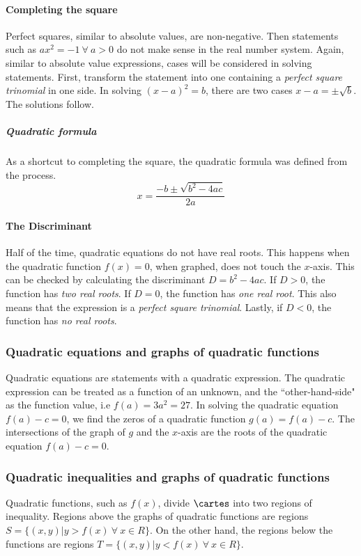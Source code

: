 \paragraph{Completing the square}
Perfect squares, similar to absolute values, are non-negative.
Then statements such as $ax^2 = -1\ \forall\ a > 0$ do not make sense in the real number system.
Again, similar to absolute value expressions, cases will be considered in solving statements.
First, transform the statement into one containing a \emph{perfect square trinomial} in one side.
In solving $(x-a)^2 = b$, there are two cases $x-a = \pm \sqrt{b}$.
The solutions follow.

\subparagraph{Quadratic formula}
As a shortcut to completing the square, the quadratic formula was defined from the process.
\[
x = \dfrac{-b \pm \sqrt{b^2-4ac}}{2a}
\]

\paragraph{The Discriminant}
Half of the time, quadratic equations do not have real roots.
This happens when the quadratic function $f(x) = 0$, when graphed, does not touch the $x$-axis.
This can be checked by calculating the discriminant $D = b^2-4ac$.
If $D > 0$, the function has \emph{two real roots}.
If $D = 0$, the function has \emph{one real root}.
This also means that the expression is a \emph{perfect square trinomial}.
Lastly, if $D < 0$, the function has \emph{no real roots}.

\subsubsection{Quadratic equations and graphs of quadratic functions}
Quadratic equations are statements with a quadratic expression.
The quadratic expression can be treated as a function of an unknown, and the ``other-hand-side" as the function value, i.e $f(a) = 3a^2 = 27$.
In solving the quadratic equation $f(a)-c = 0$, we find the zeros of a quadratic function $g(a) = f(a)-c$.
The intersections of the graph of $g$ and the $x$-axis are the roots of the quadratic equation $f(a)-c = 0$.

\subsubsection{Quadratic inequalities and graphs of quadratic functions}
Quadratic functions, such as $f(x)$, divide $\cartes$ into two regions of inequality.
Regions above the graphs of quadratic functions are regions $S = \{(x, y) | y > f(x)\ \forall\ x \in R\}$.
On the other hand, the regions below the functions are regions $T = \{(x, y) | y < f(x)\ \forall\ x \in R\}$.

